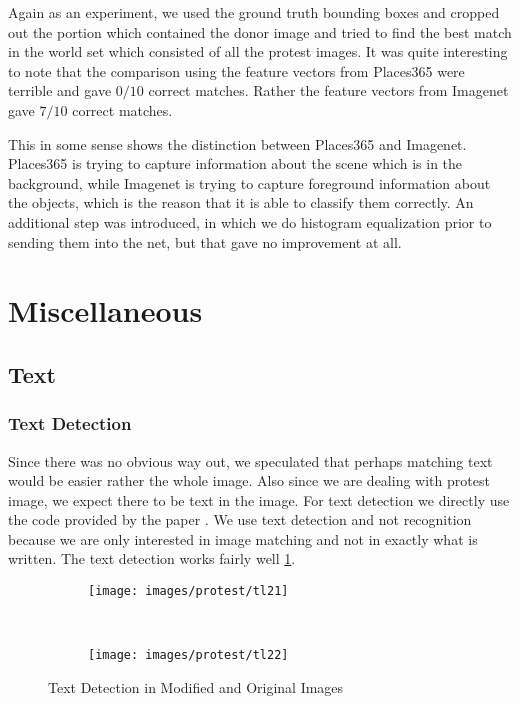 \documentclass{article}
\begin{document}
Again as an experiment, we used the ground truth bounding boxes and cropped out the portion which contained the donor image and tried to find the best match in the world set which consisted of all the protest images. It was quite interesting to note that the comparison using the feature vectors from Places365 were terrible and gave $0/10$ correct matches. Rather the feature vectors from Imagenet gave $7/10$ correct matches.

This in some sense shows the distinction between Places365 and Imagenet. Places365 is trying to capture information about the scene which is in the background, while Imagenet is trying to capture foreground information about the objects, which is the reason that it is able to classify them correctly. An additional step was introduced, in which we do histogram equalization prior to sending them into the net, but that gave no improvement at all.
\section{Miscellaneous}
\subsection{Text}
\subsubsection{Text Detection}
Since there was no obvious way out, we speculated that perhaps matching text would be easier rather the whole image. Also since we are dealing with protest image, we expect there to be text in the image. For text detection we directly use the code provided by the paper \cite{DBLP:journals/corr/TianHHH016}. We use text detection and not recognition because we are only interested in image matching and not in exactly what is written. The text detection works fairly well \ref{fig:pr_txt}.

\begin{figure}[H]
  \centering
  \begin{subfigure}[H]{0.4\linewidth}
    \texttt{[image: images/protest/tl21]}
  \end{subfigure}
  ~
  \begin{subfigure}[H]{0.4\linewidth}
    \texttt{[image: images/protest/tl22]}
  \end{subfigure}
  \caption{Text Detection in Modified and Original Images}
  \label{fig:pr_txt}
\end{figure}
\end{document}
